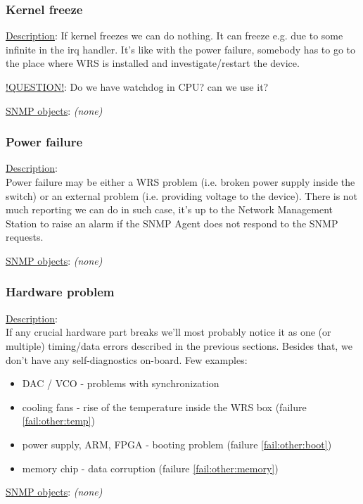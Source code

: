 \subsubsection{\bf Kernel freeze}
		\begin{packed_enum}
			\item [] \underline{Description}:
				If kernel freezes we can do nothing. It can freeze e.g. due to some
				infinite in the irq handler. It's like with the power failure, somebody
				has to go to the place where WRS is installed and investigate/restart
				the device.
			\item [] \underline{!QUESTION!}: Do we have watchdog in CPU? can we use it?
			\item [] \underline{SNMP objects}: \emph{(none)}
		\end{packed_enum}

\subsubsection{\bf Power failure}
		\begin{packed_enum}
			\item [] \underline{Description}:\\
				Power failure may be either a WRS problem (i.e. broken power supply
				inside the switch) or an external problem (i.e. providing voltage to the
				device). There is not much reporting we can do in such case, it's up to
				the Network Management Station to raise an alarm if the SNMP Agent does
				not respond to the SNMP requests.
			\item [] \underline{SNMP objects}: \emph{(none)}
		\end{packed_enum}

\subsubsection{\bf Hardware problem}
		\begin{packed_enum}
			\item [] \underline{Description}:\\
				If any crucial hardware part breaks we'll most probably notice it as one
				(or multiple) timing/data errors described in the previous sections.
				Besides that, we don't have any self-diagnostics on-board. Few examples:
				\begin{itemize}
					\item DAC / VCO - problems with synchronization
					\item cooling	fans - rise of the temperature inside the WRS box
						(failure \ref{fail:other:temp})
					\item power supply, ARM, FPGA - booting problem (failure
						\ref{fail:other:boot})
					\item memory chip - data corruption (failure \ref{fail:other:memory})
				\end{itemize}
			\item [] \underline{SNMP objects}: \emph{(none)}
		\end{packed_enum}

